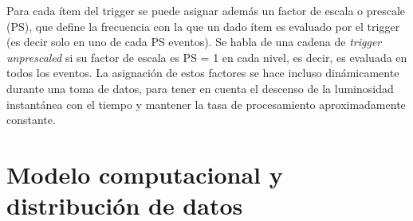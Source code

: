 
Para cada ítem del trigger se puede asignar además un factor de escala o prescale (PS), que define la frecuencia con la que un dado ítem es evaluado por el trigger (es decir solo en uno de cada PS eventos). Se habla de una cadena de \textit{trigger unprescaled} si su factor de escala es PS = 1 en cada nivel, es decir, es evaluada en todos los eventos. La asignación de estos factores se hace incluso dinámicamente durante una toma de datos, para tener en cuenta el descenso de la luminosidad instantánea con el tiempo y mantener la tasa de procesamiento aproximadamente constante.

\section{Modelo computacional y distribución de datos}


